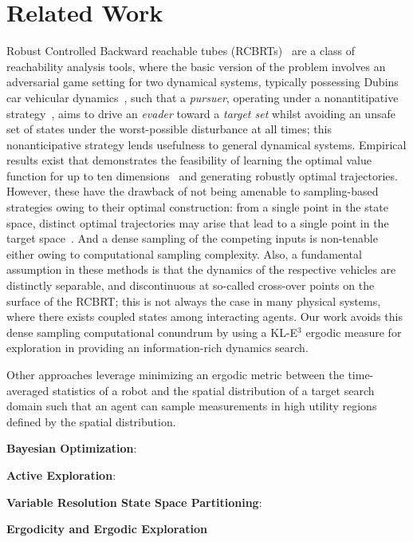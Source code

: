 \section{Related Work}

Robust Controlled Backward reachable tubes (RCBRTs)~\cite{Mitchell2021, Mitchell2005} are a class of reachability analysis tools, where the basic version of the problem involves an adversarial game setting for two dynamical systems, typically possessing Dubins car vehicular dynamics~\cite{Dubins1957}, such that a \textit{pursuer}, operating under a nonantitipative strategy~\cite{BasarBook}, aims to drive an \textit{evader} toward a \textit{target set} whilst avoiding an unsafe set of states under the worst-possible disturbance at all times; this nonanticipative strategy lends usefulness to general dynamical systems. Empirical results exist that demonstrates the feasibility of learning the optimal value function for up to ten dimensions~\cite{Bansal} and generating robustly optimal trajectories. However, these have the drawback of not being amenable to sampling-based strategies owing to their optimal construction: from a single point in the state space, distinct optimal trajectories may arise that lead to a single point in the target space~\cite{Mitchell2020}. And a dense sampling of the competing inputs is non-tenable either owing to computational sampling complexity. Also, a fundamental assumption in these methods is that the dynamics of the respective vehicles are distinctly separable, and discontinuous at so-called cross-over points on the surface of the RCBRT; this is not always the case in many physical systems, where there exists coupled states among interacting agents. Our work avoids this dense sampling computational conundrum by using a KL-E$^3$ ergodic measure for exploration in providing an information-rich dynamics search.

Other approaches leverage minimizing an ergodic metric between the time-averaged statistics of a robot and the spatial distribution of a target search domain such that an agent can sample measurements in high utility regions defined by the spatial distribution.


\textbf{Bayesian Optimization}:

\textbf{Active Exploration}:

\textbf{Variable Resolution State Space Partitioning}:

\textbf{Ergodicity and Ergodic Exploration}